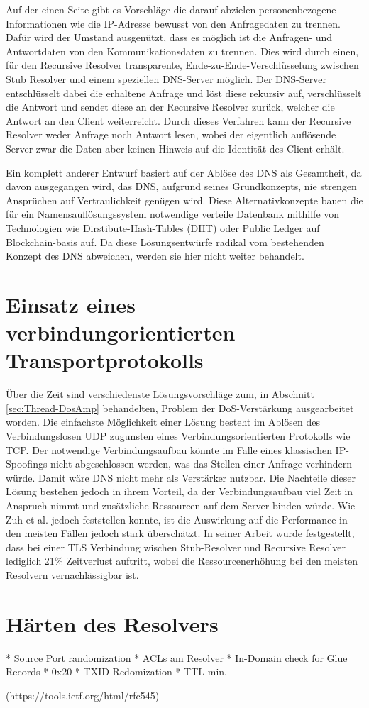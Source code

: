Auf der einen Seite gibt es Vorschläge die darauf abzielen personenbezogene Informationen wie die IP-Adresse bewusst von den Anfragedaten zu trennen. Dafür wird der Umstand ausgenützt, dass es möglich ist die Anfragen- und Antwortdaten von den Kommunikationsdaten zu trennen. Dies wird durch einen, für den Recursive Resolver transparente, Ende-zu-Ende-Verschlüsselung zwischen Stub Resolver und einem speziellen DNS-Server möglich. Der DNS-Server entschlüsselt dabei die erhaltene Anfrage und löst diese rekursiv auf, verschlüsselt die Antwort und sendet diese an der Recursive Resolver zurück, welcher die Antwort an den Client weiterreicht. Durch dieses Verfahren kann der Recursive Resolver weder Anfrage noch Antwort lesen, wobei der eigentlich auflösende Server zwar die Daten aber keinen Hinweis auf die Identität des Client erhält.

Ein komplett anderer Entwurf basiert auf der Ablöse des DNS als Gesamtheit, da davon ausgegangen wird, das DNS, aufgrund seines Grundkonzepts, nie strengen Ansprüchen auf Vertraulichkeit genügen wird. Diese Alternativkonzepte bauen die für ein Namensauflösungssystem notwendige verteile Datenbank mithilfe von Technologien wie Dirstibute-Hash-Tables (DHT) oder Public Ledger auf Blockchain-basis auf. Da diese Lösungsentwürfe radikal vom bestehenden Konzept des DNS abweichen, werden sie hier nicht weiter behandelt.      


\section{Einsatz eines verbindungorientierten Transportprotokolls}

Über die Zeit sind verschiedenste Lösungsvorschläge zum, in Abschnitt \ref{sec:Thread-DosAmp} behandelten, Problem der DoS-Verstärkung ausgearbeitet worden. Die einfachste Möglichkeit einer Lösung besteht im Ablösen des Verbindungslosen UDP zugunsten eines Verbindungsorientierten Protokolls wie TCP. Der notwendige Verbindungsaufbau könnte im Falle eines klassischen IP-Spoofings nicht abgeschlossen werden, was das Stellen einer Anfrage verhindern würde. Damit wäre DNS nicht mehr als Verstärker nutzbar. Die Nachteile dieser Lösung bestehen jedoch in ihrem Vorteil, da der Verbindungsaufbau viel Zeit in Anspruch nimmt und zusätzliche Ressourcen auf dem Server binden würde. Wie Zuh et al. \cite{Zhu2015} jedoch feststellen konnte, ist die Auswirkung auf die Performance in den meisten Fällen jedoch stark überschätzt. In seiner Arbeit wurde festgestellt, dass bei einer TLS Verbindung wischen Stub-Resolver und Recursive Resolver lediglich 21\% Zeitverlust auftritt, wobei die Ressourcenerhöhung bei den meisten Resolvern vernachlässigbar ist.

\section{Härten des Resolvers}

\begin{draft}
\begin{markdown}
* Source Port randomization
* ACLs am Resolver
* In-Domain check for Glue Records
* 0x20
* TXID Redomization
* TTL min. 
\end{markdown}

(https://tools.ietf.org/html/rfc545)

\end{draft}
